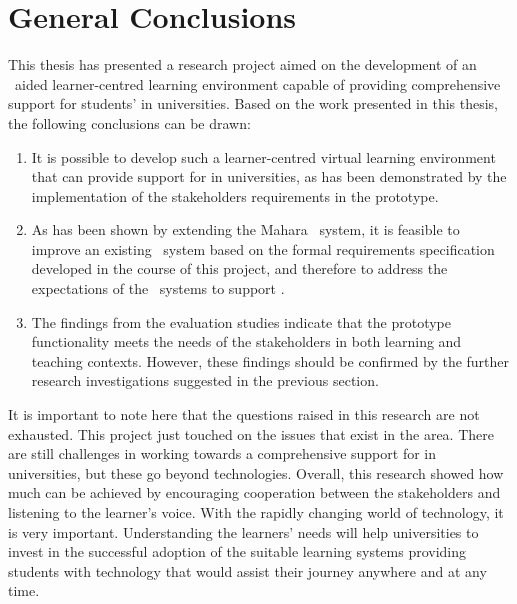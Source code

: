 \section{General Conclusions}

This thesis has presented a research project aimed on the development of an
\ep~aided learner-centred learning environment capable of providing
comprehensive support for students' \LLLs in universities. Based on the work
presented in this thesis, the following conclusions can be drawn:
\begin{enumerate}
  \item It is possible to develop such a learner-centred virtual learning
  environment that can provide support for \LLLs in universities, as has been
  demonstrated by the implementation of the stakeholders requirements in the
  prototype.
  \item As has been shown by extending the Mahara \ep~system, it is feasible to
  improve an existing \ep~system based on the formal requirements specification
  developed in the course of this project, and therefore to address the
  expectations of the \ep~systems to support \LLLsn.
  \item The findings from the evaluation studies indicate that the prototype
  functionality meets the needs of the stakeholders in both learning and
  teaching contexts. However, these findings should be confirmed by the further
  research investigations suggested in the previous section.
\end{enumerate}

It is important to note here that the questions raised in this research are
not exhausted. This project just touched on the issues that exist in the area.
There are still challenges in working towards a comprehensive support for \LLLs in
universities, but these go beyond technologies. Overall, this research showed
how much can be achieved by encouraging cooperation between the stakeholders and
listening to the learner's voice. With the rapidly changing world of technology,
it is very important. Understanding the learners' needs will help universities
to invest in the successful adoption of the suitable learning systems providing
students with technology that would assist their \LLLs journey anywhere and at
any time.
